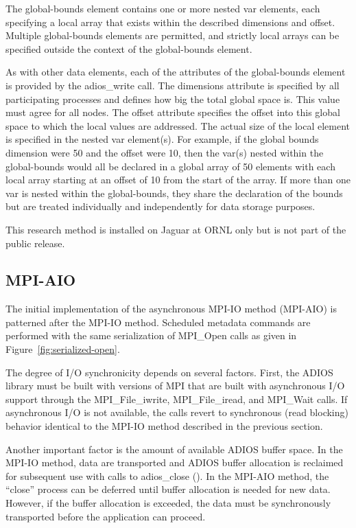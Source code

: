 The global-bounds element contains one or more nested var elements, each specifying 
a local array that exists within the described dimensions and offset.  Multiple 
global-bounds elements are permitted, and strictly local arrays can be specified 
outside the context of the global-bounds element.

As with other data elements, each of the attributes of the global-bounds element 
is provided by the adios\_write call. The dimensions attribute is specified by 
all participating processes and defines how big the total global space is.  This 
value must agree for all nodes. The offset attribute specifies the offset into 
this global space to which the local values are addressed. The actual size of the 
local element is specified in the nested var element(s).  For example, if the global 
bounds dimension were 50 and the offset were 10, then the var(s) nested within 
the global-bounds would all be declared in a global array of 50 elements with each 
local array starting at an offset of 10 from the start of the array.  If more than 
one var is nested within the global-bounds, they share the declaration of the bounds 
but are treated individually and independently for data storage purposes. 

This research method is installed on Jaguar at ORNL only but is not part of the 
public release.

\subsection{MPI-AIO}

The initial implementation of the asynchronous MPI-IO method (MPI-AIO) is patterned 
after the MPI-IO method. Scheduled metadata commands are performed with the same 
serialization of MPI\_Open calls as given in Figure~\ref{fig:serialized-open}.

The degree of I/O synchronicity depends on several factors. First, the ADIOS library 
must be built with versions of MPI that are built with asynchronous I/O support 
through the MPI\_File\_iwrite, MPI\_File\_iread, and MPI\_Wait calls. If asynchronous 
I/O is not available, the calls revert to synchronous (read blocking) behavior 
identical to the MPI-IO method described in the previous section. 

Another important factor is the amount of available ADIOS buffer space. In the 
MPI-IO method, data are transported and ADIOS buffer allocation is reclaimed for 
subsequent use with calls to adios\_close (). In the MPI-AIO method, the ``close'' 
process can be deferred until buffer allocation is needed for new data. However, 
if the buffer allocation is exceeded, the data must be synchronously transported 
before the application can proceed.

